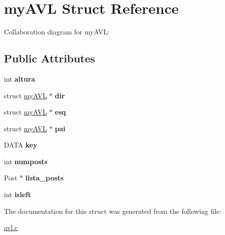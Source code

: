 \hypertarget{structmyAVL}{}\section{my\+A\+VL Struct Reference}
\label{structmyAVL}


Collaboration diagram for my\+A\+VL\+:
\subsection*{Public Attributes}
\begin{DoxyCompactItemize}
\item 
int {\bfseries altura}\hypertarget{structmyAVL_a51947f0c377bea5fb04678f40dcadb31}{}\label{structmyAVL_a51947f0c377bea5fb04678f40dcadb31}

\item 
struct \hyperlink{structmyAVL}{my\+A\+VL} $\ast$ {\bfseries dir}\hypertarget{structmyAVL_a400b9981ae39d046b97d3a02aee5564f}{}\label{structmyAVL_a400b9981ae39d046b97d3a02aee5564f}

\item 
struct \hyperlink{structmyAVL}{my\+A\+VL} $\ast$ {\bfseries esq}\hypertarget{structmyAVL_a03e9e39d6d2879b0e2a15c041a3f28fe}{}\label{structmyAVL_a03e9e39d6d2879b0e2a15c041a3f28fe}

\item 
struct \hyperlink{structmyAVL}{my\+A\+VL} $\ast$ {\bfseries pai}\hypertarget{structmyAVL_a93ceb2fe3dcc180086ce2a961d3bc733}{}\label{structmyAVL_a93ceb2fe3dcc180086ce2a961d3bc733}

\item 
D\+A\+TA {\bfseries key}\hypertarget{structmyAVL_a3954236e84ac004df480dac0a6ad4bda}{}\label{structmyAVL_a3954236e84ac004df480dac0a6ad4bda}

\item 
int {\bfseries numposts}\hypertarget{structmyAVL_a45d4b36bbb845790bcddbbf0e27632f4}{}\label{structmyAVL_a45d4b36bbb845790bcddbbf0e27632f4}

\item 
Post $\ast$ {\bfseries lista\+\_\+posts}\hypertarget{structmyAVL_aa38481876921b38dc89d4ca389c9c49c}{}\label{structmyAVL_aa38481876921b38dc89d4ca389c9c49c}

\item 
int {\bfseries isleft}\hypertarget{structmyAVL_a89c2be1bdcff4e638e653262bc289e0e}{}\label{structmyAVL_a89c2be1bdcff4e638e653262bc289e0e}

\end{DoxyCompactItemize}


The documentation for this struct was generated from the following file\+:\begin{DoxyCompactItemize}
\item 
\hyperlink{avl_8c}{avl.\+c}\end{DoxyCompactItemize}

